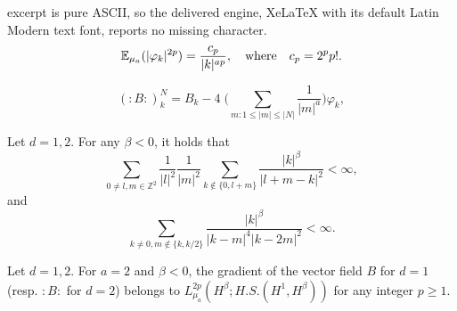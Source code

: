 \documentclass[10pt,a4paper]{amsart}
\newcommand{\Z}{\mathbb{Z}}
\begin{document}
excerpt is pure ASCII, so the delivered engine, XeLaTeX with its default Latin Modern text font, reports no missing character.
\begin{equation}
\label{formvar}
\mathbb{E}_{\mu_a} (|\varphi_k|^{2p})=\dfrac{c_p}{|k|^{ap}}, \quad \mbox{\rm where} \quad 
c_p= 2^p p!.
\end{equation} 

\begin{equation} 	\label{:B:}
(:B:)_k^N= B_k - 4 \; \Big(\sum_{m:1\leq |m| \leq |N|} \frac{1}{|m|^a}\Big) \varphi_k,
\end{equation}

\begin{lem}
\label{convseries} Let $d=1,2$. 
For any $\beta<0$, it holds that
\begin{equation} \label{convseries1}
\sum_{0\neq l,m\in \Z^2} \dfrac{1}{|l|^2}\dfrac{1}{|m|^2} \sum_{k\not\in \{0, l+m\}} \dfrac{|k|^{\beta}}{|l+m-k|^2}<\infty, 
\end{equation}
and
\begin{equation}  \label{convseries2}
\sum_{k\neq 0, m\not\in \{k, k/2\} } \dfrac{|k|^{\beta}}{|k-m|^4 |k-2m|^2}<\infty.
\end{equation}
\end{lem}

\begin{prop}
 Let $d=1,2$. For $a=2$ and $\beta <0$, the gradient of the vector field $B$ for $d=1$ (resp. $:B:$ for $d=2$) belongs to $L^{2p}_{\mu_a} (H^\beta ; H.S. (H^1 ,H^\beta))$ for any integer $p\geq 1$.

\end{prop}
\end{document}
